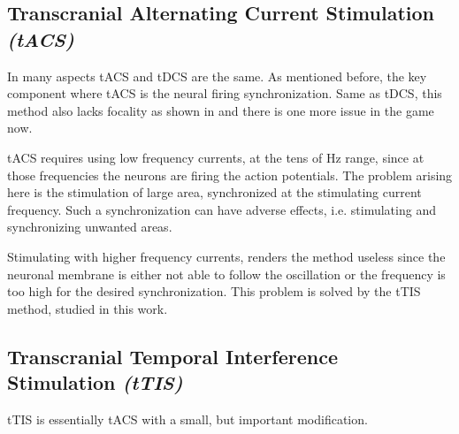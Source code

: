\subsection{Transcranial Alternating Current Stimulation \textit{(tACS)}}

In many aspects \gls{tACS} and \gls{tDCS} are the same. As mentioned before, the key component where \gls{tACS}  is the neural firing synchronization. Same as \gls{tDCS}, this method also lacks focality as shown in  and there is one more issue in the game now.


\gls{tACS} requires using low frequency currents, at the tens of Hz range, since at those frequencies the neurons are firing the action potentials. The problem arising here is the stimulation of large area, synchronized at the stimulating current frequency. Such a synchronization can have adverse effects, i.e. stimulating and synchronizing unwanted areas.

Stimulating with higher frequency currents, renders the method useless since the neuronal membrane is either not able to follow the oscillation or the frequency is too high for the desired synchronization. This problem is solved by the \gls{tTIS} method, studied in this work.

\subsection{Transcranial Temporal Interference Stimulation \textit{(tTIS)}}

\gls{tTIS} is essentially \gls{tACS} with a small, but important modification.



